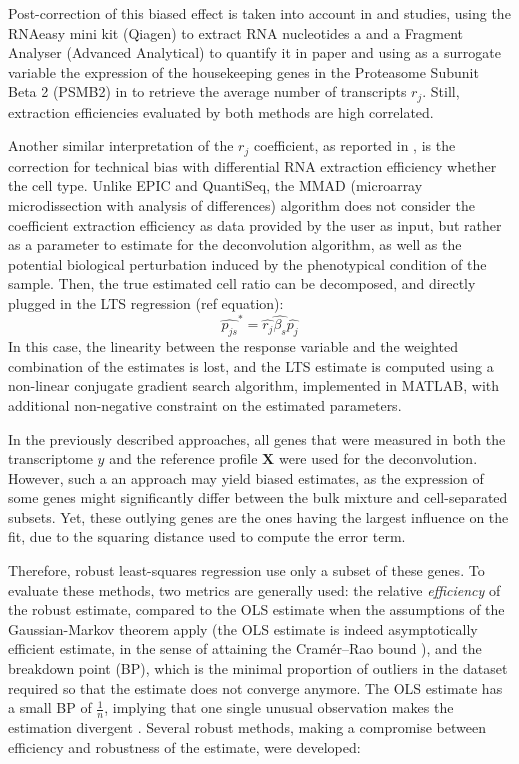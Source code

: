 Post-correction of this biased effect is taken into account in
\autocite{racle_etal17} and \autocite{finotello_etal19}
studies, using the RNAeasy mini kit (Qiagen) to extract RNA nucleotides
a and a Fragment Analyser (Advanced Analytical) to quantify it in
\autocite{racle_etal17} paper and
using as a surrogate variable the expression of the housekeeping genes
in the Proteasome Subunit Beta 2 (PSMB2)
\autocite{eisenberg_levanon13} in \autocite{finotello_etal19} to retrieve 
the average number of transcripts \(r_j\). Still,
extraction efficiencies evaluated by both methods are high correlated.

Another similar interpretation of the \(r_j\) coefficient, as reported
in \autocite{liebner_etal14}, is the correction for technical bias with differential RNA
extraction efficiency whether the cell type. Unlike EPIC and QuantiSeq,
the MMAD (microarray microdissection with analysis of differences)
algorithm does not consider the coefficient extraction efficiency as
data provided by the user as input, but rather as a parameter to
estimate for the deconvolution algorithm, as well as the potential
biological perturbation induced by the phenotypical condition of the
sample. Then, the true estimated cell ratio can be decomposed, and
directly plugged in the LTS regression (ref equation): \[
\hat{p_{js}}^*= \hat{r_j} \hat{\beta_s} \hat{p_j}
\] In this case, the linearity between the response variable and the
weighted combination of the estimates is lost, and the LTS estimate is
computed using a non-linear conjugate gradient search algorithm,
implemented in MATLAB, with additional non-negative constraint on the
estimated parameters.

In the previously described approaches, all genes that were measured in
both the transcriptome \(y\) and the reference profile \(\boldsymbol{X}\)
were used for the deconvolution. However, such a an approach may yield
biased estimates, as the expression of some genes might significantly
differ between the bulk mixture and cell-separated subsets. Yet, these
outlying genes are the ones having the largest influence on the fit, due
to the squaring distance used to compute the error term.

Therefore, robust least-squares regression use only a subset of these
genes. To evaluate these methods, two metrics are generally used: the
relative \emph{efficiency} of the robust estimate, compared to the OLS
estimate when the assumptions of the Gaussian-Markov theorem apply (the
OLS estimate is indeed asymptotically efficient estimate, in the sense
of attaining the Cramér--Rao bound ), and the breakdown point (BP),
which is the minimal proportion of outliers in the dataset required so
that the estimate does not converge anymore. The OLS estimate has a
small BP of \(\frac{1}{n}\), implying that one single unusual
observation makes the estimation divergent
\autocite{rousseeuw85}. Several robust
methods, making a compromise between efficiency and robustness of the
estimate, were developed:

